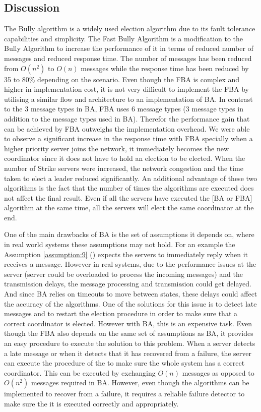 \documentclass[dareport.tex]{subfiles}
\begin{document}
\subsection{Discussion}
The Bully algorithm is a widely used election algorithm due to its fault tolerance capabilities and simplicity. The Fast Bully Algorithm is a modification to the Bully Algorithm to increase the performance of it in terms of reduced number of messages and reduced response time. The number of messages has been reduced from $ O(n^2) $ to $ O(n) $ messages while the response time has been reduced by 35 to 80\% depending on the scenario. Even though the FBA is complex and higher in implementation cost, it is not very difficult to implement the FBA by utilising a similar flow and architecture to an implementation of BA. In contrast to the 3 message types in BA, FBA uses 6 message types (3 message types in addition to the message types used in BA). Therefor the performance gain that can be achieved by FBA outweighs the implementation overhead. We were able to observe a significant increase in the response time with FBA specially when a higher priority server joins the network, it immediately becomes the new coordinator since it does not have to hold an election to be elected. When the number of Strike servers were increased, the network congestion and the time taken to elect a leader reduced significantly. An additional advantage of these two algorithms is the fact that the number of times the algorithms are executed does not affect the final result. Even if all the servers have executed the [BA or FBA] algorithm at the same time, all the servers will elect the same coordinator at the end.

One of the main drawbacks of BA is the set of assumptions it depends on, where in real world systems these assumptions may not hold. For an example the Assumption \ref{assumption:9} () expects the servers to immediately reply when it receives a message. However in real systems, due to the performance issues at the server (server could be overloaded to process the incoming messages) and the transmission delays, the message processing and transmission could get delayed. And since BA relies on timeouts to move between states, these delays could affect the accuracy of the algorithms. One of the solutions for this issue is to detect late messages and to restart the election procedure in order to make sure that a correct coordinator is elected. However with BA, this is an expensive task. Even though the FBA also depends on the same set of assumptions as BA, it provides an easy procedure to execute the solution to this problem. When a server detects a late message or when it detects that it has recovered from a failure, the server can execute the  procedure of the  to make sure the whole system has a correct coordinator. This can be executed by exchanging $ O(n) $ messages as opposed to $ O(n^2) $ messages required in BA. However, even though the algorithms can be implemented to recover from a failure, it requires a reliable failure detector to make sure the it is executed correctly and appropriately.
\end{document}
